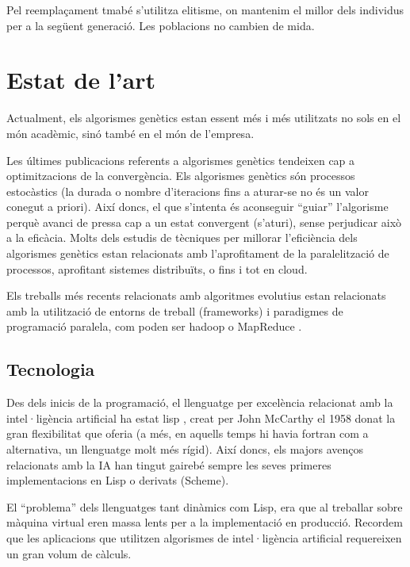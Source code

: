 Pel reemplaçament tmabé s'utilitza elitisme, on mantenim el millor dels
individus per a la següent generació.  Les poblacions no cambien de 
mida.


\section{Estat de l'art} %
\label{sec:Estat de l'art}

Actualment, els algorismes genètics estan essent més i més utilitzats no sols en
el món acadèmic, sinó també en el món de l'empresa. 


Les últimes publicacions referents a algorismes genètics tendeixen cap a
optimitzacions de la convergència.  Els algorismes genètics són processos
estocàstics (la durada o nombre d'iteracions fins a aturar-se no és un valor
conegut a priori).  Així doncs, el que s'intenta és aconseguir ``guiar''
l'algorisme perquè avanci de pressa cap a un estat convergent (s'aturi), sense
perjudicar això a la eficàcia.  Molts dels estudis de tècniques per millorar
l'eficiència dels algorismes genètics estan relacionats amb l'aprofitament de la
paralelització de processos, aprofitant sistemes distribuïts, o fins i tot en
cloud.  

Els treballs més recents relacionats amb algoritmes evolutius estan relacionats
amb la utilització de entorns de treball (frameworks) i paradigmes de
programació paralela, com poden ser hadoop o MapReduce \cite{VLCG09}.

\subsection{Tecnologia} %
\label{sub:Tecnologia}

Des dels inicis de la programació, el llenguatge per excelència
relacionat amb la intel·ligència artificial ha estat lisp \cite{JMC59}, creat per John
McCarthy el 1958 donat la gran flexibilitat que oferia (a més, en aquells temps
hi havia fortran com a alternativa, un llenguatge molt més rígid).  Així doncs,
els majors avenços relacionats amb la IA han tingut gairebé sempre les seves
primeres implementacions en Lisp o derivats (Scheme).  

El ``problema'' dels llenguatges tant dinàmics com Lisp, era que al treballar sobre
màquina virtual eren massa lents per a la implementació en producció.  Recordem que les
aplicacions que utilitzen algorismes de intel·ligència artificial requereixen un
gran volum de càlculs.

